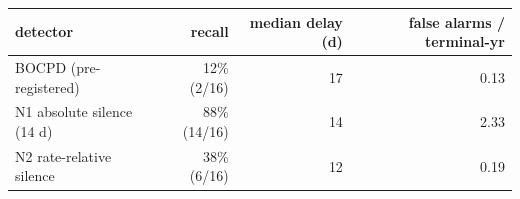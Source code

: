 \begin{tabular}{lrrr}
\toprule
detector & recall & median delay (d) & false alarms / terminal-yr \\
\midrule
BOCPD (pre-registered) & 12\% (2/16) & 17 & 0.13 \\
N1 absolute silence (14 d) & 88\% (14/16) & 14 & 2.33 \\
N2 rate-relative silence & 38\% (6/16) & 12 & 0.19 \\
\bottomrule
\end{tabular}
